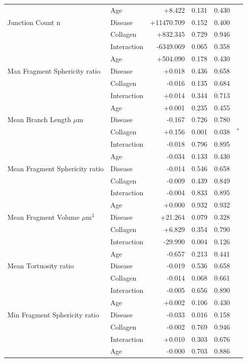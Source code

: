 \documentclass[11pt,a4paper]{article}
\begin{document}
\begin{longtable}{llrrrr}
   & Age & +8.422 & 0.131 & 0.430 &  \\
  Junction Count n & Disease & +11470.709 & 0.152 & 0.400 &  \\
   & Collagen & +832.345 & 0.729 & 0.946 &  \\
   & Interaction & -6349.069 & 0.065 & 0.358 &  \\
   & Age & +504.090 & 0.178 & 0.430 &  \\
  Max Fragment Sphericity ratio & Disease & +0.018 & 0.436 & 0.658 &  \\
   & Collagen & -0.016 & 0.135 & 0.684 &  \\
   & Interaction & +0.014 & 0.344 & 0.713 &  \\
   & Age & +0.001 & 0.235 & 0.455 &  \\
  Mean Branch Length $\mu$m & Disease & -0.167 & 0.726 & 0.780 &  \\
   & Collagen & +0.156 & 0.001 & 0.038 & $^{*}$ \\
   & Interaction & -0.018 & 0.796 & 0.895 &  \\
   & Age & -0.034 & 0.133 & 0.430 &  \\
  Mean Fragment Sphericity ratio & Disease & -0.014 & 0.546 & 0.658 &  \\
   & Collagen & -0.009 & 0.439 & 0.849 &  \\
   & Interaction & -0.004 & 0.833 & 0.895 &  \\
   & Age & +0.000 & 0.932 & 0.932 &  \\
  Mean Fragment Volume $\mu$m$^{3}$ & Disease & +21.264 & 0.079 & 0.328 &  \\
   & Collagen & +6.829 & 0.354 & 0.790 &  \\
   & Interaction & -29.990 & 0.004 & 0.126 &  \\
   & Age & -0.657 & 0.213 & 0.441 &  \\
  Mean Tortuosity ratio & Disease & -0.019 & 0.536 & 0.658 &  \\
   & Collagen & -0.014 & 0.068 & 0.661 &  \\
   & Interaction & -0.005 & 0.656 & 0.890 &  \\
   & Age & +0.002 & 0.106 & 0.430 &  \\
  Min Fragment Sphericity ratio & Disease & -0.033 & 0.016 & 0.158 &  \\
   & Collagen & -0.002 & 0.769 & 0.946 &  \\
   & Interaction & +0.010 & 0.303 & 0.676 &  \\
   & Age & -0.000 & 0.703 & 0.886 &  \\

\end{longtable}
\end{document}
